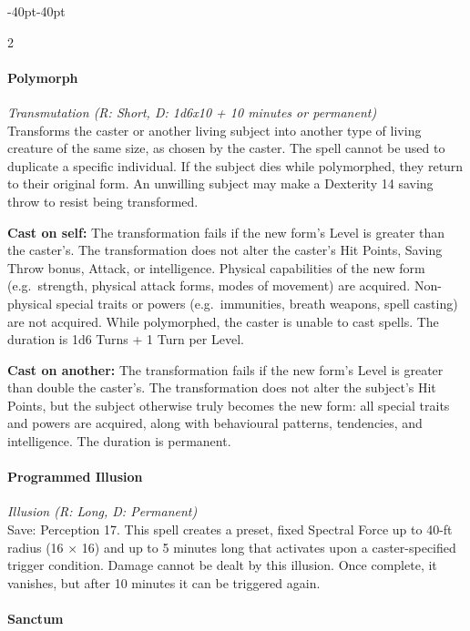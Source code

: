 \documentclass{book}
\begin{document}
\begin{adjustwidth}{-40pt}{-40pt}
\begin{multicols}{2}
\paragraph{Polymorph}\label{polymorph}

\emph{Transmutation (R: Short, D: 1d6x10 + 10 minutes or permanent)}\\
Transforms the caster or another living subject into another type of
living creature of the same size, as chosen by the caster. The spell
cannot be used to duplicate a specific individual. If the subject dies
while polymorphed, they return to their original form. An unwilling
subject may make a Dexterity 14 saving throw to resist being
transformed.

\textbf{Cast on self:} The transformation fails if the new form's Level
is greater than the caster's. The transformation does not alter the
caster's Hit Points, Saving Throw bonus, Attack, or intelligence.
Physical capabilities of the new form (e.g.~strength, physical attack
forms, modes of movement) are acquired. Non-physical special traits or
powers (e.g.~immunities, breath weapons, spell casting) are not
acquired. While polymorphed, the caster is unable to cast spells. The
duration is 1d6 Turns + 1 Turn per Level.

\textbf{Cast on another:} The transformation fails if the new form's
Level is greater than double the caster's. The transformation does not
alter the subject's Hit Points, but the subject otherwise truly becomes
the new form: all special traits and powers are acquired, along with
behavioural patterns, tendencies, and intelligence. The duration is
permanent.

\paragraph{Programmed Illusion}\label{programmed-illusion}

\emph{Illusion (R: Long, D: Permanent)}\\
Save: Perception 17. This spell creates a preset, fixed Spectral Force
up to 40-ft radius (16 × 16) and up to 5 minutes long that activates
upon a caster-specified trigger condition. Damage cannot be dealt by
this illusion. Once complete, it vanishes, but after 10 minutes it can
be triggered again.

\paragraph{Sanctum}\label{sanctum}


\end{multicols}
\end{adjustwidth}
\end{document}
